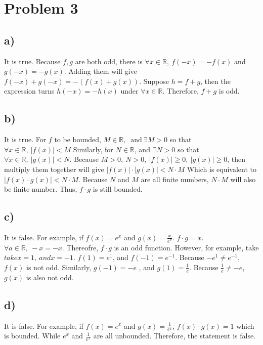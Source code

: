 \documentclass[a4paper,fleqn]{article}
\begin{document}
\section*{Problem 3}
    \subsection*{a)}
    It is true.
        Because \(f,g\) are both odd, there is \(\forall x\in \mathbb{R}, \ f(-x)=-f(x)\) and \(g(-x)=-g(x)\). 
        Adding them will give \(f(-x)+g(-x)=-\left(f(x)+g(x)\right)\). Suppose \(h=f+g\), then the expression 
        turns \(h(-x)=-h(x)\) under \(\forall x \in \mathbb{R}\). Therefore, \(f+g\) is odd.
    \subsection*{b)}
    It is true.
        For \(f\) to be bounded, \(M\in \mathbb{R}, \ \text{ and} \ \exists M > 0\) so that \(\forall x \in \mathbb{R}, \ \left | f(x) \right | < M\)
        Similarly, for \(N\in \mathbb{R}\), and \(\exists N>0\) so that \(\forall x\in \mathbb{R}, \ |g(x)|<N\).
        Because \(M>0,\ N>0,\ |f(x)|\geqslant 0,\ |g(x)| \geqslant 0\), then multiply them together will give \(|f(x)|\cdot |g(x)|<N\cdot M\) Which is 
        equivalent to \(|f(x)\cdot g(x)|<N\cdot M\). Because \(N\) and \(M\) are all finite numbers, \(N\cdot M\) will also be finite number. Thus, \(f\cdot g\) is still bounded.
    \subsection*{c)}
    It is false.
        For example, if \(f(x)=e^x\) and \(g(x)=\frac x {e^x}\). \(f\cdot g = x\). \(\forall a \in \mathbb{R}, \ 
        -x = -x \). Thereofre, \(f\cdot g\) is an odd function. However, for example, take\(take x=1, \ and x=-1\). 
        \(f(1)=e^1\), and \(f(-1)=e^{-1}\). Because \(-e^1 \neq e^{-1}\), \(f(x)\) is not odd. Similarly, \(g(-1)=-e\)
        , and \(g(1)=\frac 1 e\). Because \(\frac 1 e \neq -e\), \(g(x)\) is also not odd.
    \subsection*{d)}
    It is false.
        For example, if \(f(x)=e^x\) and \(g(x) = \frac 1 {e^x}\), \(f(x)\cdot g(x) = 1\) which is bounded. While  \(e^x\) and \(\frac 1 {e^x}\) are all unbounded.
        Therefore, the statement is false.
\end{document}
